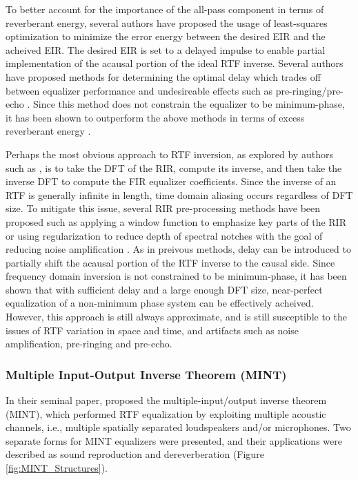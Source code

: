 To better account for the importance of the all-pass component in terms of reverberant energy, several authors \citep[e.g., ][]{clarkson1985spectral} have proposed the usage of least-squares optimization to minimize the error energy between the desired EIR and the acheived EIR.  The desired EIR is set to a delayed impulse to enable partial implementation of the acausal portion of the ideal RTF inverse. Several authors have proposed methods for determining the optimal delay which trades off between equalizer performance and undesireable effects such as pre-ringing/pre-echo \citep{clarkson1985spectral, ford1978optimum}. Since this method does not constrain the equalizer to be minimum-phase, it has been shown to outperform the above methods in terms of excess reverberant energy \citep{mourjopoulos1982comparative}.

Perhaps the most obvious approach to RTF inversion, as explored by authors such as \cite{kulp1988digital}, is to take the DFT of the RIR, compute its inverse, and then take the inverse DFT to compute the FIR equalizer coefficients. Since the inverse of an RTF is generally infinite in length, time domain aliasing occurs regardless of DFT size. To mitigate this issue, several RIR pre-processing methods have been proposed such as applying a window function to emphasize key parts of the RIR \citep{kulp1988digital} or using regularization to reduce depth of spectral notches with the goal of reducing noise amplification \citep{bean1989loudspeaker, kirkeby1996fast}. As in preivous methods, delay can be introduced to partially shift the acausal portion of the RTF inverse to the causal side. Since frequency domain inversion is not constrained to be minimum-phase, it has been shown that with sufficient delay and a large enough DFT size, near-perfect equalization of a non-minimum phase system can be effectively acheived. However, this approach is still always approximate, and is still susceptible to the issues of RTF variation in space and time, and artifacts such as noise amplification, pre-ringing and pre-echo.


\subsubsection{Multiple Input-Output Inverse Theorem (MINT)} \label{MINT}

In their seminal paper, \cite{miyoshi1986inverse} proposed the multiple-input/output inverse theorem (MINT), which performed RTF equalization by exploiting multiple acoustic channels, i.e., multiple spatially separated loudspeakers and/or microphones. Two separate forms for MINT equalizers were presented, and their applications were described as sound reproduction and dereverberation (Figure \ref{fig:MINT_Structures}).

